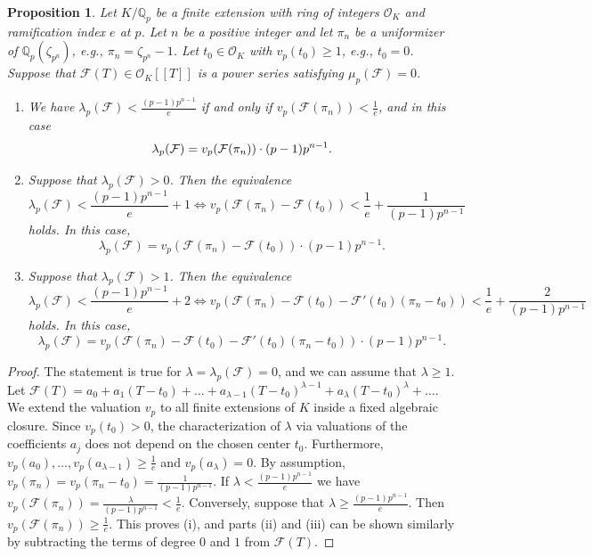 \documentclass[10pt,a4paper]{amsart}
\newtheorem{prop}{Proposition}
\newcommand{\QQ}{\mathbb{Q}}
\begin{document}
\begin{prop} Let $K/\QQ_p$ be a finite extension with ring of integers $\mathcal{O}_K$ and ramification index $e$ at $p$. Let $n$ be a positive integer  and let 
$\pi_n $ be a uniformizer of $\QQ_p(\zeta_{p^n})$, 
e.g.,  $\pi_n = \zeta_{p^n} - 1$. 
Let $t_0 \in \mathcal{O}_K$ with $v_p(t_0) \geq 1$, e.g., $t_0=0$. 
Suppose that
$\mathcal{F}(T)  \in \mathcal{O}_K[[T]]$ is a power series satisfying $\mu_p(\mathcal{F})=0$. 
\begin{enumerate}
\item[(i)] We have $\lambda_p(\mathcal{F}) < \frac{(p-1)p^{n-1}}{e}$ if and only if  $v_p(\mathcal{F}(\pi_n )) < \frac{1}{e}$, and in this case
$$ \lambda_p(\mathcal{F}) = v_p(\mathcal{F}(\pi_n ))\cdot (p-1)p^{n-1} .\\ $$ 
\item[(ii)] Suppose that $\lambda_p(\mathcal{F}) > 0$. Then the equivalence 
$$\lambda_p(\mathcal{F}) < \frac{(p-1)p^{n-1}}{e} + 1 \Longleftrightarrow v_p(\mathcal{F}(\pi_n ) - \mathcal{F}(t_0)) <  \frac{1}{e} + \frac{1}{(p-1)p^{n-1}}$$
holds. In this case,
$$  \lambda_p(\mathcal{F})  = v_p(\mathcal{F}(\pi_n ) - \mathcal{F}(t_0)) \cdot (p-1)p^{n-1}   .$$
\item[(iii)] Suppose that $\lambda_p(\mathcal{F}) > 1$. Then  the equivalence 
$$\lambda_p(\mathcal{F}) < \frac{(p-1)p^{n-1}}{e} + 2 \Longleftrightarrow v_p(\mathcal{F}(\pi_n ) - \mathcal{F}(t_0) -   \mathcal{F}'(t_0)(\pi_n - t_0)) <  \frac{1}{e} + \frac{2}{(p-1)p^{n-1}}$$
holds. In this case,
$$  \lambda_p(\mathcal{F})  = v_p(\mathcal{F}(\pi_n ) - \mathcal{F}(t_0) -   \mathcal{F}'(t_0 ) (\pi_n - t_0) ) \cdot (p-1)p^{n-1}  .$$

\end{enumerate}

\label{secondkind}
\end{prop}

\begin{proof} The statement is true for $\lambda= \lambda_p(\mathcal{F})=0$, and we can assume that $\lambda   \geq 1$. 
Let $\mathcal{F}(T)=a_0 + a_1 (T-t_0) + \dots + a_{\lambda-1}(T-t_0)^{\lambda -1} + a_{\lambda} (T-t_0)^{\lambda} + \dots $. 
We extend the valuation $v_p$ to all finite extensions of $K$ inside a fixed algebraic closure. 
Since $v_p(t_0) > 0$,  
the characterization of $\lambda$ via valuations of the coefficients $a_j$ does not depend on the chosen center $t_0$.
Furthermore, $v_p(a_0), \dots , v_p(a_{\lambda-1}) \geq  \frac{1}{e}$ and $v_p(a_{\lambda})=0$. By assumption, $v_p(\pi_n) = v_p(\pi_n - t_0) = \frac{1}{(p-1)p^{n-1}}$. If $\lambda <  \frac{(p-1)p^{n-1}}{e}$ we have $v_p(\mathcal{F}(\pi_n)) = \frac{\lambda}{(p-1)p^{n-1}} < \frac{1}{e}$. Conversely, suppose that $\lambda \geq \frac{(p-1)p^{n-1}}{e}$.
Then  $v_p(\mathcal{F}(\pi_n )) \geq \frac{1}{e}$. 
This proves (i), and parts (ii) and (iii) can be shown similarly by subtracting the terms of degree $0$ and $1$  from $\mathcal{F}(T)$.
\end{proof}
\end{document}
